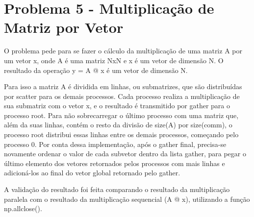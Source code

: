 \section{Problema 5 - Multiplicação de Matriz por Vetor}

O problema pede para se fazer o cálculo da multiplicação de uma matriz A por um vetor x, onde A é uma matriz NxN e x é um vetor de dimensão N. O resultado da operação y = A @ x é um vetor de dimensão N.

Para isso a matriz A é dividida em linhas, ou submatrizes, que são distribuídas por scatter para os demais processos. Cada processo realiza a multiplicação de sua submatriz com o vetor x, e o resultado é transmitido por gather para o processo root. 
Para não sobrecarregar o último processo com uma matriz que, além da suas linhas, contém o resto da divisão de size(A) por size(comm), o processo root distribui essas linhas entre os demais processos, começando pelo processo 0. 
Por conta dessa implementação, após o gather final, precisa-se novamente ordenar o valor de cada subvetor dentro da lista gather, para pegar o último elemento dos vetores retornados pelos processos com mais linhas e adicioná-los ao final do vetor global retornado pelo gather.

A validação do resultado foi feita comparando o resultado da multiplicação paralela com o resultado da multiplicação sequencial (A @ x), utilizando a função np.allclose().
